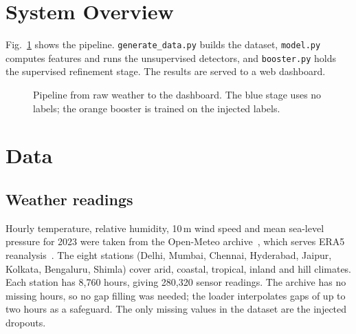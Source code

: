 \documentclass[conference]{IEEEtran}
\begin{document}
\section{System Overview}
Fig.~\ref{fig:pipeline} shows the pipeline. \texttt{generate\_data.py} builds the dataset,
\texttt{model.py} computes features and runs the unsupervised detectors, and \texttt{booster.py}
holds the supervised refinement stage. The results are served to a web dashboard.

\begin{figure}[t]
\centering
{}
\caption{Pipeline from raw weather to the dashboard. The blue stage uses no labels; the orange
booster is trained on the injected labels.}
\label{fig:pipeline}
\end{figure}

\section{Data}
\subsection{Weather readings}
Hourly temperature, relative humidity, 10\,m wind speed and mean sea-level pressure for 2023 were
taken from the Open-Meteo archive~\cite{openmeteo}, which serves ERA5 reanalysis~\cite{hersbach2020}.
The eight stations (Delhi, Mumbai, Chennai, Hyderabad, Jaipur, Kolkata, Bengaluru, Shimla) cover
arid, coastal, tropical, inland and hill climates. Each station has 8{,}760 hours, giving
280{,}320 sensor readings. The archive has no missing hours, so no gap filling was needed; the loader
interpolates gaps of up to two hours as a safeguard. The only missing values in the dataset are the
injected dropouts.
\end{document}
